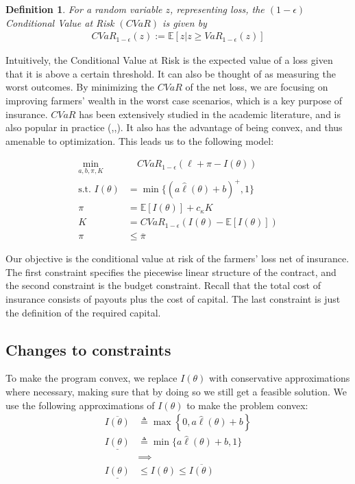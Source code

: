 \documentclass[11pt]{article}
\newtheorem{defn}[lemma]{Definition}
\begin{document}
  \begin{defn}
    For a random variable $z$, representing loss, the $(1-\epsilon)$ Conditional Value at Risk $(CVaR)$ is given by 
    \begin{align*}
      CVaR_{1-\epsilon}(z) := \mathbb{E}\left [z | z \geq VaR_{1-\epsilon}(z) \right ]
    \end{align*}
  \end{defn}

  Intuitively, the Conditional Value at Risk is the expected value of a loss given that it is above a certain threshold. It can also be thought of as measuring the worst outcomes. By minimizing the $CVaR$ of the net loss, we are focusing on improving farmers' wealth in the worst case scenarios, which is a key purpose of insurance. $CVaR$ has been extensively studied in the academic literature, and is also popular in practice (\cite{rockafellar2000optimization},\cite{rockafellar2002conditional},\cite{artzner1999coherent}). It also has the advantage of being convex, and thus amenable to optimization. This leads us to the following model: 

  \begin{align}
  \min_{a,b,\pi, K}  & \quad CVaR_{1-\epsilon}\left ( \ell + \pi - I(\theta) \right)\\
  \text{s.t.   }I(\theta) &= \min \{ (a\hat{\ell}(\theta) + b)^+,1\} \\
   \pi &= \mathbb{E}\left [ I(\theta) \right ] + c_{\kappa} K \\
  K &=  CVaR_{1-\epsilon}\left ( I(\theta)  - \mathbb{E}[I(\theta)] \right ) \label{cons-budget} \\
  \pi &\leq \overline{\pi}
  \end{align}

  Our objective is the conditional value at risk of the farmers' loss net of insurance. The first constraint specifies the piecewise linear structure of the contract, and the second constraint is the budget constraint. Recall that the total cost of insurance consists of payouts plus the cost of capital. The last constraint is just the definition of the required capital. 
  
  \subsection{Changes to constraints}
  To make the program convex, we replace $I(\theta)$ with conservative approximations where necessary, making sure that by doing so we still get a feasible solution. We use the following approximations of $I(\theta)$ to make the problem convex: 
\begin{align*}
    \overline{I(\theta)} &\triangleq \max \left \{ 0,a\hat{\ell}(\theta) + b\right \} \\
    \underline{I(\theta)} &\triangleq \min \{ a\hat{\ell}(\theta) + b,1 \}\\
    &\implies \\
    \underline{I(\theta)} &\leq I(\theta) \leq \overline{I(\theta)}
\end{align*}
  
\end{document}
